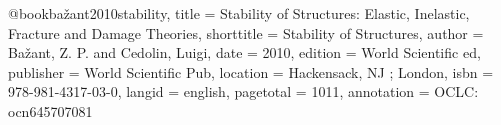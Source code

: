 
@book{bažant2010stability,
  title = {Stability of Structures: Elastic, Inelastic, Fracture and Damage Theories},
  shorttitle = {Stability of Structures},
  author = {Bažant, Z. P. and Cedolin, Luigi},
  date = {2010},
  edition = {World Scientific ed},
  publisher = {World Scientific Pub},
  location = {Hackensack, NJ ; London},
  isbn = {978-981-4317-03-0},
  langid = {english},
  pagetotal = {1011},
  annotation = {OCLC: ocn645707081}
}

